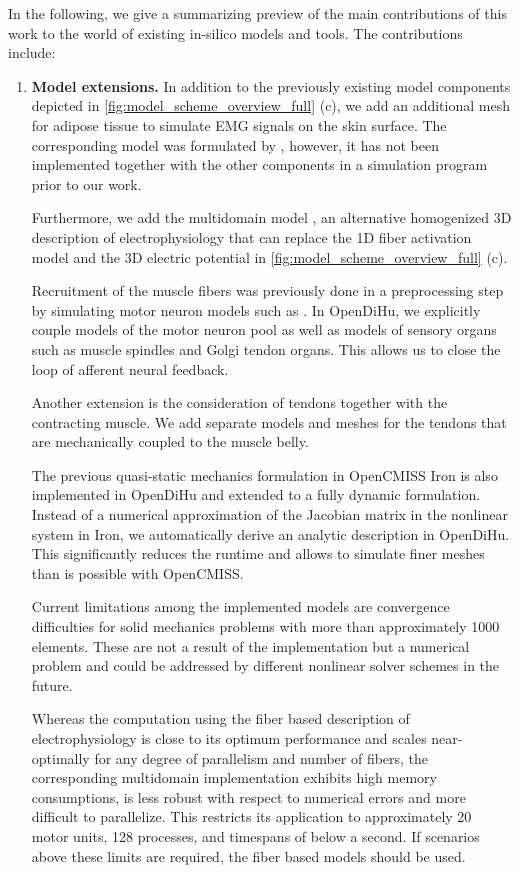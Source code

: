 In the following, we give a summarizing preview of the main contributions of this work to the world of existing in-silico models and tools. The contributions include:
\begin{enumerate}[label=(\roman*)]
  \item \textbf{Model extensions.} In addition to the previously existing model components depicted in \cref{fig:model_scheme_overview_full} (c), we add an additional mesh for adipose tissue to simulate EMG signals on the skin surface. The corresponding model was formulated by \cite{Mordhorst2015}, however, it has not been implemented together with the other components in a simulation program prior to our work.

Furthermore, we add the multidomain model \cite{Klotz2020}, an alternative homogenized 3D description of electrophysiology that can replace the 1D fiber activation model and the 3D electric potential in \cref{fig:model_scheme_overview_full} (c). 

Recruitment of the muscle fibers was previously done in a preprocessing step by simulating motor neuron models such as \cite{Cisi2008,Negro2011}. In OpenDiHu, we explicitly couple models of the motor neuron pool as well as models of sensory organs such as muscle spindles and Golgi tendon organs. This allows us to close the loop of afferent neural feedback.

Another extension is the consideration of tendons together with the contracting muscle. We add separate models and meshes for the tendons that are mechanically coupled to the muscle belly.

The previous quasi-static mechanics formulation in OpenCMISS Iron is also implemented in OpenDiHu and extended to a fully dynamic formulation. Instead of a numerical approximation of the Jacobian matrix in the nonlinear system in Iron, we automatically derive an analytic description in OpenDiHu. This significantly reduces the runtime and allows to simulate finer meshes than is possible with OpenCMISS.

Current limitations among the implemented models are convergence difficulties for solid mechanics problems with more than approximately 1000 elements. These are not a result of the implementation but a numerical problem and could be addressed by different nonlinear solver schemes in the future.

Whereas the computation using the fiber based description of electrophysiology is close to its optimum performance and scales near-optimally for any degree of parallelism and number of fibers, the corresponding multidomain implementation exhibits high memory consumptions, is less robust with respect to numerical errors and more difficult to parallelize. This restricts its application to approximately 20 motor units, 128 processes, and timespans of below a second. If scenarios above these limits are required, the fiber based models should be used.


\end{enumerate}
